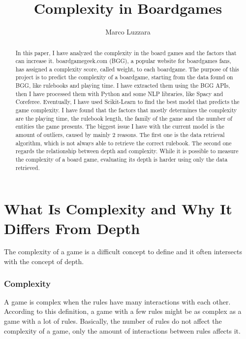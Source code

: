 \documentclass[runningheads]{llncs}
\begin{document}
%
\title{Complexity in Boardgames}
%
%
\author{Marco Luzzara}
%
%

%
\maketitle              %
%
\begin{abstract}
In this paper, I have analyzed the complexity in the board games and the factors that can increase it. boardgamegeek.com (BGG), a popular website for boardgames fans, has assigned a complexity score, called weight, to each boardgame. The purpose of this project is to predict the complexity of a boardgame, starting from the data found on BGG, like rulebooks and playing time. I have extracted them using the BGG APIs, then I have processed them with Python and some NLP libraries, like Spacy and Coreferee. Eventually, I have used Scikit-Learn to find the best model that predicts the game complexity.
I have found that the factors that mostly determines the complexity are the playing time, the rulebook length, the family of the game and the number of entities the game presents.
The biggest issue I have with the current model is the amount of outliers, caused by mainly 2 reasons. The first one is the data retrieval algorithm, which is not always able to retrieve the correct rulebook. The second one regards the relationship between depth and complexity. While it is possible to measure the complexity of a board game, evaluating its depth is harder using only the data retrieved.

\end{abstract}
%
%
%

\section{What Is Complexity and Why It Differs From Depth}
The complexity of a game is a difficult concept to define and it often intersects with the concept of depth. 

\subsubsection{Complexity}
A game is complex when the rules have many interactions with each other. According to this definition, a game with a few rules might be as complex as a game with a lot of rules. Basically, the number of rules do not affect the complexity of a game, only the amount of interactions between rules affects it.
\end{document}
